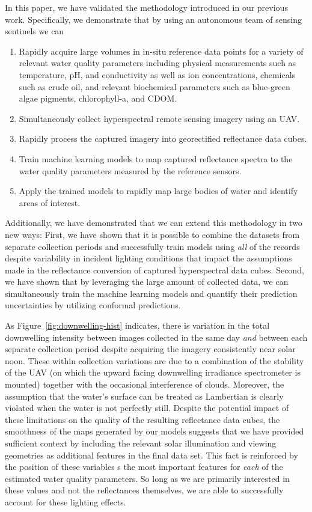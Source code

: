\documentclass[sensors,article,submit,pdftex,moreauthors]{Definitions/mdpi}
\begin{document}
In this paper, we have validated the methodology introduced in our previous work\cite{robotTeam1}. Specifically, we demonstrate that by using an autonomous team of sensing sentinels we can
\begin{enumerate}
    \item Rapidly acquire large volumes in in-situ reference data points for a variety of relevant water quality parameters including physical measurements such as temperature, pH, and conductivity as well as ion concentrations, chemicals such as crude oil, and relevant biochemical parameters such as blue-green algae pigments, chlorophyll-a, and CDOM. 
    \item Simultaneously collect hyperspectral remote sensing imagery using an UAV.
    \item Rapidly process the captured imagery into georectified reflectance data cubes.
    \item Train machine learning models to map captured reflectance spectra to the water quality parameters measured by the reference sensors.
    \item Apply the trained models to rapidly map large bodies of water and identify areas of interest.
\end{enumerate}
Additionally, we have demonstrated that we can extend this methodology in two new ways: First, we have shown that it is possible to combine the datasets from separate collection periods and successfully train models using \textit{all} of the records despite variability in incident lighting conditions that impact the assumptions made in the reflectance conversion of captured hyperspectral data cubes. Second, we have shown that by leveraging the large amount of collected data, we can simultaneously train the machine learning models and quantify their prediction uncertainties by utilizing conformal predictions. 

As Figure~\ref{fig:downwelling-hist} indicates, there is variation in the total downwelling intensity between images collected in the same day \textit{and} between each separate collection period despite acquiring the imagery consistently near solar noon. These within collection variations are due to a combination of the stability of the UAV (on which the upward facing downwelling irradiance spectrometer is mounted) together with the occasional interference of clouds. Moreover, the assumption that the water's surface can be treated as Lambertian is clearly violated when the water is not perfectly still. Despite the potential impact of these limitations on the quality of the resulting reflectance data cubes, the smoothness of the maps generated by our models suggests that we have provided sufficient context by including the relevant solar illumination and viewing geometries as additional features in the final data set.  This fact is reinforced by the position of these variables s the most important features for \textit{each} of the estimated water quality parameters. So long as we are primarily interested in these values and not the reflectances themselves, we are able to successfully account for these lighting effects.
\end{document}
